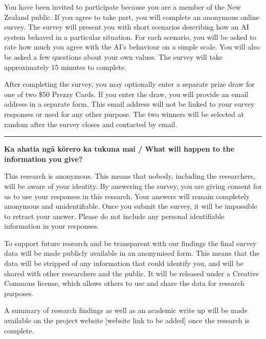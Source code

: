 \documentclass[11pt, a4paper]{article}
\begin{document}
\smallskip

\noindent You have been invited to participate because you are a member of the
New Zealand public. If you agree to take part, you will complete an anonymous
online survey. The survey will present you with short scenarios describing how
an AI system behaved in a particular situation. For each scenario, you will be
asked to rate how much you agree with the AI's behaviour on a simple scale. You
will also be asked a few questions about your own values. The survey will take
approximately 15 minutes to complete.

\medskip

After completing the survey, you may optionally enter a separate prize draw for
one of two \$50 Prezzy Cards. If you enter the draw, you will provide an email
address in a separate form. This email address will not be linked to your survey
responses or used for any other purpose. The two winners will be selected at
random after the survey closes and contacted by email.

\bigskip

\noindent\textcolor{rulered}{\rule{\textwidth}{0.4pt}}

\noindent\textbf{Ka ahatia ng\={a} k\={o}rero ka tukuna mai / What will happen to the information you give?}

\smallskip

\noindent This research is anonymous. This means that nobody, including the
researchers, will be aware of your identity. By answering the survey, you are
giving consent for us to use your responses in this research. Your answers will
remain completely anonymous and unidentifiable. Once you submit the survey, it
will be impossible to retract your answer. Please do not include any personal
identifiable information in your responses.

\bigskip

To support future research and be transparent with our findings the final survey data will be made publicly available in an anonymised form. This means that the data will be stripped of any information that could identify you, and will be shared with other researchers and the public. It will be released under a Creative Commons license, which allows others to use and share the data for research purposes.

\bigskip

A summary of research findings as well as an academic write up will be made available on the project website [website link to be added] once the research is complete.
\end{document}
